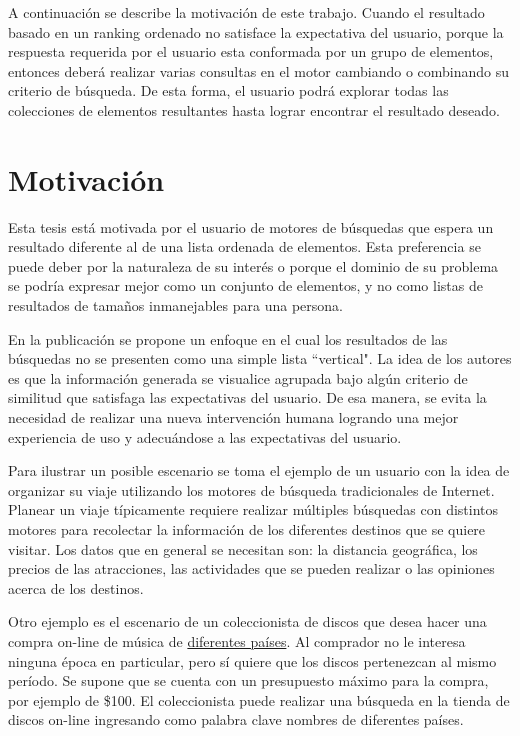 A continuación se describe la motivación de este trabajo. Cuando el resultado basado en un ranking ordenado no satisface la expectativa del usuario, porque la respuesta requerida por el usuario esta conformada por un grupo de elementos, entonces deberá realizar varias consultas en el motor cambiando o combinando su criterio de búsqueda. De esta forma, el usuario podrá explorar todas las colecciones de elementos resultantes hasta lograr encontrar el resultado deseado.

\section{Motivación}
Esta tesis está motivada por el usuario de motores de búsquedas que espera un resultado diferente al de una lista ordenada de elementos. Esta preferencia se puede deber por la naturaleza de su interés o porque el dominio de su problema se podría expresar mejor como un conjunto de elementos, y no como listas de resultados de tamaños inmanejables para una persona.

En la publicación \cite{journals/tkde/Amer-YahiaBCFMZ14} se propone un enfoque en el cual los resultados de las búsquedas no se presenten como una simple lista ``vertical". La idea de los autores es que la información generada se visualice agrupada bajo algún criterio de similitud que satisfaga las expectativas del usuario. De esa manera, se evita la necesidad de realizar una nueva intervención humana logrando una mejor experiencia de uso y adecuándose a las expectativas del usuario.

Para ilustrar un posible escenario se toma el ejemplo de un usuario con la idea de organizar su viaje utilizando los motores de búsqueda tradicionales de Internet. Planear un viaje típicamente requiere realizar múltiples búsquedas con distintos motores para recolectar la información de los diferentes destinos que se quiere visitar. Los datos que en general se necesitan son: la distancia geográfica, los precios de las atracciones, las actividades que se pueden realizar o las opiniones acerca de los destinos.

Otro ejemplo es el escenario de un coleccionista de discos que desea hacer una compra on-line de música de \underline{diferentes países}. Al comprador no le interesa ninguna época en particular, pero sí quiere que los discos pertenezcan al mismo período. Se supone que se cuenta con un presupuesto máximo para la compra, por ejemplo de \$100. El coleccionista puede realizar una búsqueda en la tienda de discos on-line ingresando como palabra clave nombres de diferentes países. 

